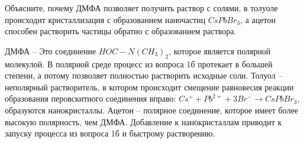 
Объясните, почему ДМФА позволяет получить раствор с солями, в толуоле происходит кристаллизация с образованием наночастиц $CsPbBr_3$, а ацетон способен растворить частицы обратно с образованием раствора.

\explanationSection

ДМФА – Это соединение $HOC-N(CH_3)_2$, которое является полярной молекулой. В полярной среде процесс из вопроса 1б протекает в большей степени, а потому позволяет полностью растворить исходные соли. Толуол – неполярный растворитель, в котором происходит смещение равновесия реакции образования перовскитного соединения вправо: $Cs^+ + Pb^{2+} + 3Br^- \rightarrow CsPbBr_3$, образуются нанокристаллы. Ацетон – полярное соединение, которое имеет более высокую полярность, чем ДМФА. Добавление к нанокристаллам приводит к запуску процесса из вопроса 1б и быстрому растворению.